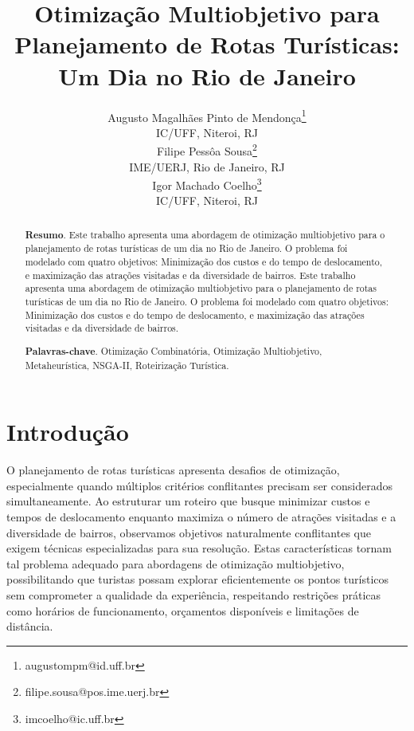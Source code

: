 \documentclass{pssbmac}
\begin{document}

\title{Otimização Multiobjetivo para Planejamento de Rotas Turísticas: Um Dia no Rio de Janeiro}

\author{
    {\large Augusto Magalhães Pinto de Mendonça}\thanks{augustompm@id.uff.br}\\
    {\small IC/UFF, Niteroi, RJ} \\
    {\large Filipe Pessôa Sousa}\thanks{filipe.sousa@pos.ime.uerj.br}\\
    {\small IME/UERJ, Rio de Janeiro, RJ} \\    
    {\large Igor Machado Coelho}\thanks{imcoelho@ic.uff.br}\\
    {\small IC/UFF, Niteroi, RJ} \\
}
\criartitulo



\begin{abstract}
{\bf Resumo}. Este trabalho apresenta uma abordagem de otimização multiobjetivo para o planejamento de rotas turísticas de um dia no Rio de Janeiro. O problema foi modelado com quatro objetivos: Minimização dos custos e do tempo de deslocamento, e maximização das atrações visitadas e da diversidade de bairros.
Este trabalho apresenta uma abordagem de otimização multiobjetivo para o planejamento de rotas turísticas de um dia no Rio de Janeiro. O problema foi modelado com quatro objetivos: Minimização dos custos e do tempo de deslocamento, e maximização das atrações visitadas e da diversidade de bairros. 

\noindent
{\bf Palavras-chave}. Otimização Combinatória, Otimização Multiobjetivo, Metaheurística, NSGA-II, Roteirização Turística.
\end{abstract}

\section{Introdução}

O planejamento de rotas turísticas apresenta desafios de otimização, especialmente quando múltiplos critérios conflitantes precisam ser considerados simultaneamente. Ao estruturar um roteiro que busque minimizar custos e tempos de deslocamento enquanto maximiza o número de atrações visitadas e a diversidade de bairros, observamos objetivos naturalmente conflitantes que exigem técnicas especializadas para sua resolução. Estas características tornam tal problema adequado para abordagens de otimização multiobjetivo, possibilitando que turistas possam explorar eficientemente os pontos turísticos sem comprometer a qualidade da experiência, respeitando restrições práticas como horários de funcionamento, orçamentos disponíveis e limitações de distância.
\end{document}
